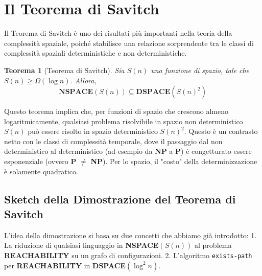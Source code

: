 \documentclass[a4paper]{article}
\newtheorem{theorem}{Teorema}
\begin{document}
\section{Il Teorema di Savitch}
Il Teorema di Savitch è uno dei risultati più importanti nella teoria della complessità spaziale, poiché stabilisce una relazione sorprendente tra le classi di complessità spaziali deterministiche e non deterministiche.

\begin{theorem}[Teorema di Savitch]
Sia $S(n)$ una funzione di spazio, tale che $S(n) \geq \Omega(\log n)$. Allora,
\[ \mathbf{NSPACE}(S(n)) \subseteq \mathbf{DSPACE}(S(n)^2) \]
\end{theorem}

Questo teorema implica che, per funzioni di spazio che crescono almeno logaritmicamente, qualsiasi problema risolvibile in spazio non deterministico $S(n)$ può essere risolto in spazio deterministico $S(n)^2$. Questo è un contrasto netto con le classi di complessità temporale, dove il passaggio dal non deterministico al deterministico (ad esempio da \textbf{NP} a \textbf{P}) è congetturato essere esponenziale (ovvero \textbf{P} $\ne$ \textbf{NP}). Per lo spazio, il "costo" della determinizzazione è solamente quadratico.

\subsection{Sketch della Dimostrazione del Teorema di Savitch}
L'idea della dimostrazione si basa su due concetti che abbiamo già introdotto:
1.  La riduzione di qualsiasi linguaggio in \textbf{NSPACE}$(S(n))$ al problema \textbf{REACHABILITY} su un grafo di configurazioni.
2.  L'algoritmo \texttt{exists-path} per \textbf{REACHABILITY} in \textbf{DSPACE}$(\log^2 n)$.
\end{document}
